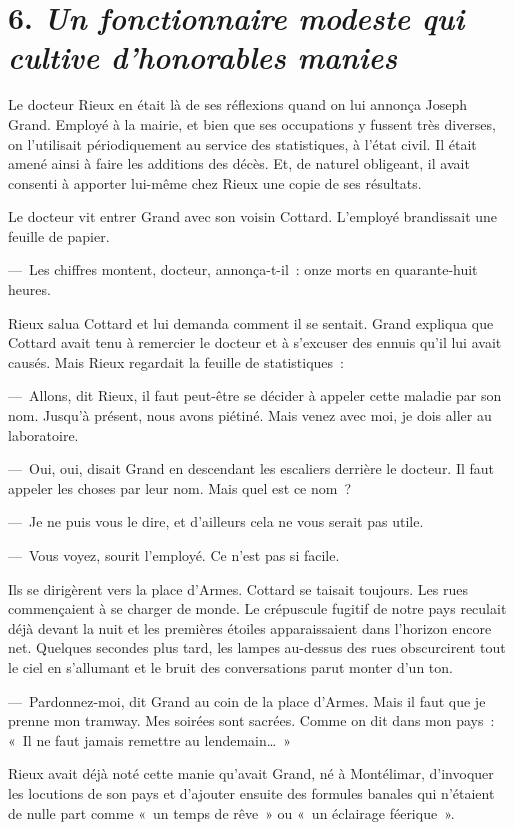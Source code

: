 \documentclass[french,twoside]{book} %
\begin{document}
\section[{6. Un fonctionnaire modeste qui cultive d’honorables manies}]{6. \emph{Un fonctionnaire modeste qui cultive d’honorables manies}}
\noindent Le docteur Rieux en était là de ses réflexions quand on lui annonça Joseph Grand. Employé à la mairie, et bien que ses occupations y fussent très diverses, on l’utilisait périodiquement au service des statistiques, à l’état civil. Il était amené ainsi à faire les additions des décès. Et, de naturel obligeant, il avait consenti à apporter lui-même chez Rieux une copie de ses résultats.\par
Le docteur vit entrer Grand avec son voisin Cottard. L’employé brandissait une feuille de papier.\par
— Les chiffres montent, docteur, annonça-t-il : onze morts en quarante-huit heures.\par
Rieux salua Cottard et lui demanda comment il se sentait. Grand expliqua que Cottard avait tenu à remercier le docteur et à s’excuser des ennuis qu’il lui avait causés. Mais Rieux regardait la feuille de statistiques :\par
— Allons, dit Rieux, il faut peut-être se décider à appeler cette maladie par son nom. Jusqu’à présent, nous avons piétiné. Mais venez avec moi, je dois aller au laboratoire.\par
— Oui, oui, disait Grand en descendant les escaliers derrière le docteur. Il faut appeler les choses par leur nom. Mais quel est ce nom ?\par
— Je ne puis vous le dire, et d’ailleurs cela ne vous serait pas utile.\par
— Vous voyez, sourit l’employé. Ce n’est pas si facile.\par
Ils se dirigèrent vers la place d’Armes. Cottard se taisait toujours. Les rues commençaient à se charger de monde. Le crépuscule fugitif de notre pays reculait déjà devant la nuit et les premières étoiles apparaissaient dans l’horizon encore net. Quelques secondes plus tard, les lampes au-dessus des rues obscurcirent tout le ciel en s’allumant et le bruit des conversations parut monter d’un ton.\par
— Pardonnez-moi, dit Grand au coin de la place d’Armes. Mais il faut que je prenne mon tramway. Mes soirées sont sacrées. Comme on dit dans mon pays : « Il ne faut jamais remettre au lendemain… »\par
Rieux avait déjà noté cette manie qu’avait Grand, né à Montélimar, d’invoquer les locutions de son pays et d’ajouter ensuite des formules banales qui n’étaient de nulle part comme « un temps de rêve » ou « un éclairage féerique ».\par
\end{document}
